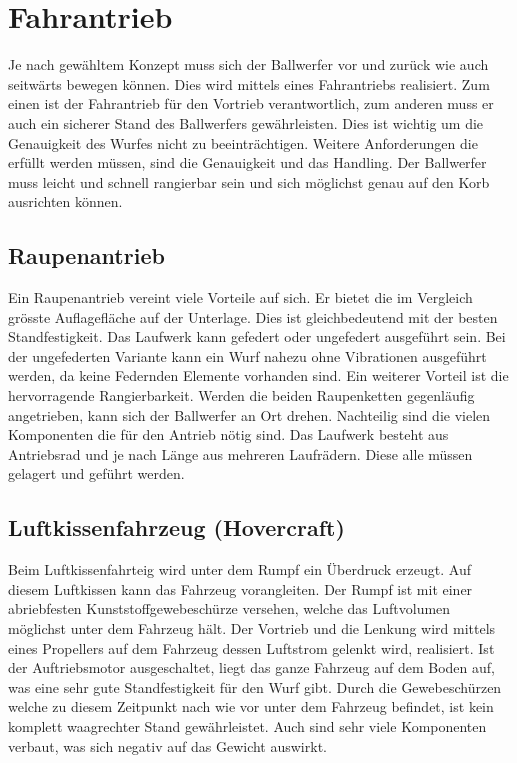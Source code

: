 \section{Fahrantrieb}
Je nach gewähltem Konzept muss sich der Ballwerfer vor und zurück wie auch seitwärts bewegen können. Dies wird mittels eines Fahrantriebs realisiert. Zum einen ist der Fahrantrieb für den Vortrieb verantwortlich, zum anderen muss er auch ein sicherer Stand des Ballwerfers gewährleisten. Dies ist wichtig um die Genauigkeit des Wurfes nicht zu beeinträchtigen. Weitere Anforderungen die erfüllt werden müssen, sind die Genauigkeit und das Handling. Der Ballwerfer muss leicht und schnell rangierbar sein und sich möglichst genau auf den Korb ausrichten können. 

\subsection{Raupenantrieb}
Ein Raupenantrieb vereint viele Vorteile auf sich. Er bietet die im Vergleich grösste Auflagefläche auf der Unterlage. Dies ist gleichbedeutend mit der besten Standfestigkeit. Das Laufwerk kann gefedert oder ungefedert ausgeführt sein. Bei der ungefederten Variante kann ein Wurf nahezu ohne Vibrationen ausgeführt werden, da keine Federnden Elemente vorhanden sind. Ein weiterer Vorteil ist die hervorragende Rangierbarkeit. Werden die beiden Raupenketten gegenläufig angetrieben, kann sich der Ballwerfer an Ort drehen. Nachteilig sind die vielen Komponenten die für den Antrieb nötig sind. Das Laufwerk besteht aus Antriebsrad und je nach Länge aus mehreren Laufrädern. Diese alle müssen gelagert und geführt werden. 
 
\subsection{Luftkissenfahrzeug (Hovercraft)}
Beim Luftkissenfahrteig wird unter dem Rumpf ein Überdruck erzeugt. Auf diesem Luftkissen kann das Fahrzeug vorangleiten. Der Rumpf ist mit einer abriebfesten Kunststoffgewebeschürze versehen, welche das Luftvolumen möglichst unter dem Fahrzeug hält. Der Vortrieb und die Lenkung wird mittels eines Propellers auf dem Fahrzeug dessen Luftstrom gelenkt wird, realisiert. Ist der Auftriebsmotor ausgeschaltet, liegt das ganze Fahrzeug auf dem Boden auf, was eine sehr gute Standfestigkeit für den Wurf gibt. Durch die Gewebeschürzen welche zu diesem Zeitpunkt nach wie vor unter dem Fahrzeug befindet, ist kein komplett waagrechter Stand gewährleistet. Auch sind sehr viele Komponenten verbaut, was sich negativ auf das Gewicht auswirkt.

